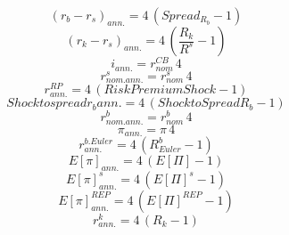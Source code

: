 \documentclass[10pt,a4paper]{article}
\begin{document}
\begin{dmath}
 (r_b - r_s)_{ann.} =4\, \left(Spread_R_b-1\right)
\end{dmath}
\begin{dmath}
 (r_k - r_s)_{ann.} =4\, \left(\frac{ R_k }{R^s}-1\right)
\end{dmath}
\begin{dmath}
 i_{ann.}= r^{CB}_{nom}\, 4
\end{dmath}
\begin{dmath}
 r^s_{nom.ann.}= r^s_{nom}\, 4
\end{dmath}
\begin{dmath}
 r^{RP}_{ann.}=4\, \left( Risk Premium Shock -1\right)
\end{dmath}
\begin{dmath}
Shock to spread r_b ann.=4\, \left(Shock to Spread R_b-1\right)
\end{dmath}
\begin{dmath}
 r^b_{nom.ann.}= r^b_{nom}\, 4
\end{dmath}
\begin{dmath}
 \pi_{ann.} = \pi \, 4
\end{dmath}
\begin{dmath}
 r^{b.Euler}_{ann.} =4\, \left( R^b_{Euler} -1\right)
\end{dmath}
\begin{dmath}
 E[\pi]_{ann.} =4\, \left( E[\Pi] -1\right)
\end{dmath}
\begin{dmath}
 E[\pi]_{ann.}^{s} =4\, \left( E[\Pi]^{s} -1\right)
\end{dmath}
\begin{dmath}
 E[\pi]_{ann.}^{REP} =4\, \left( E[\Pi]^{REP} -1\right)
\end{dmath}
\begin{dmath}
 r^k_{ann.} =4\, \left( R_k -1\right)
\end{dmath}
\end{document}
